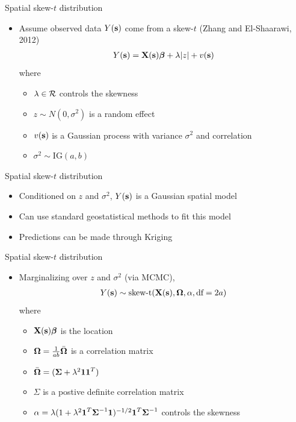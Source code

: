 \documentclass{beamer}
\begin{document}
\begin{frame}{Spatial skew-$t$ distribution}
  \begin{itemize} \setlength{\itemsep}{0.5em}
    \item Assume observed data $Y(\mbox{\bf s})$ come from a skew-$t$ (Zhang and El-Shaarawi, 2012)
    \begin{align*}
      Y(\mbox{\bf s}) = \mbox{\bf X}(\mbox{\bf s})\mbox{\boldmath $\beta$} + \lambda |z| + v(\mbox{\bf s})
    \end{align*}
    where
    \begin{itemize} \setlength{\itemsep}{0.25em}
      \item $\lambda \in {\cal R}$ controls the skewness
      \item $z \sim N(0, \sigma^2)$ is a random effect
      \item $v(\mbox{\bf s})$ is a Gaussian process with variance $\sigma^2$ and \Matern correlation
      \item $\sigma^2 \sim \text{IG}(a, b)$
    \end{itemize}
  \end{itemize}
\end{frame}

\begin{frame}{Spatial skew-$t$ distribution}
  \begin{itemize} \setlength{\itemsep}{0.5em}
   \item \alert{Conditioned} on $z$ and $\sigma^2$, $Y(\mbox{\bf s})$ is a Gaussian spatial model
    \item Can use standard geostatistical methods to fit this model
    \item Predictions can be made through Kriging
  \end{itemize}
\end{frame}

\begin{frame}{Spatial skew-$t$ distribution}
  \begin{itemize} \setlength{\itemsep}{0.5em}
    \item \alert{Marginalizing} over $z$ and $\sigma^2$ (via MCMC),
    \begin{align*}
      Y(\mbox{\bf s}) \sim \text{skew-t}(\mbox{\bf X}(\mbox{\bf s}), \mbox{\boldmath $\Omega$}, \alpha, \text{df}=2a)
    \end{align*}
    where
    \begin{itemize}
      \item $\mbox{\bf X}(\mbox{\bf s}) \mbox{\boldmath $\beta$}$ is the location
      \item $\mbox{\boldmath $\Omega$} = \frac{1}{ab} \bar{\mbox{\boldmath $\Omega$}}$ is a correlation matrix
      \item $\bar{\mbox{\boldmath $\Omega$}} = (\mbox{\boldmath $\Sigma$} + \lambda^2 \mbox{\boldmath $1$} \mbox{\boldmath $1$}^T)$
      \item $\Sigma$ is a postive definite correlation matrix
      \item $\alpha = \lambda( 1 + \lambda^2 \mbox{\boldmath $1$}^T \mbox{\boldmath $\Sigma$}^{-1} \mbox{\boldmath $1$})^{-1/2} \mbox{\boldmath $1$}^T \mbox{\boldmath $\Sigma$}^{-1}$ controls the skewness
    \end{itemize}
  \end{itemize}
\end{frame}
\end{document}
